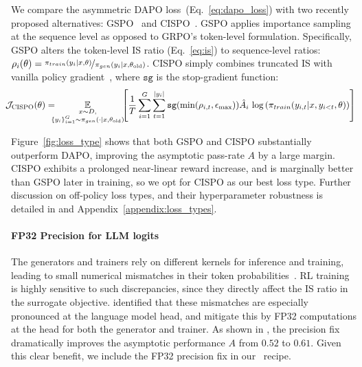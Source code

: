 We compare the asymmetric DAPO loss~(Eq.~\ref{eq:dapo_loss}) with two recently proposed alternatives: GSPO~\citep{gspo} and CISPO~\citep{minimax_m1, feng2025yourefficient}. GSPO applies importance sampling at the sequence level as opposed to GRPO’s token-level formulation. Specifically, GSPO alters the token-level IS ratio (Eq.~\ref{eq:is}) to sequence-level ratios: $ \rho_i(\theta) = \nicefrac{\pi_{train}(y_i|x, \theta)}{\pi_{gen}(y_i|x, \theta_{\text{old}})}$. CISPO simply combines truncated IS with vanilla policy gradient~\citep{ionides2008truncated}, where $\texttt{sg}$ is the stop-gradient function:
\begin{equation}
\hspace{-0.7em} \mathcal{J}_{\mathrm{CISPO}}(\theta) 
=\hspace{-0.7em} \underset{\substack{x \sim D, \\ \{y_i\}_{i=1}^G \sim \pi_{gen}(\cdot \mid x, \theta_{\text{old}})}}{\mathbb{E}}
\hspace{-0.4em}
\left[ \frac{1}{T} \sum_{i=1}^G \sum_{t=1}^{|y_i|} 
\texttt{sg}(\mathrm{min}(\rho_{i, t}, \epsilon_\text{max})) 
\hat{A}_i \, \log\left(\pi_{train}(y_{i,t}|x, y_{i<t},\theta)\right) \right]
\label{eq:cispo}
\end{equation} 


Figure~\ref{fig:loss_type} shows that both GSPO and CISPO substantially outperform DAPO, improving the asymptotic pass-rate $A$ by a large margin. CISPO exhibits a prolonged near-linear reward increase, and is marginally better than GSPO later in training, so we opt for CISPO as our best loss type. Further discussion on off-policy loss types, and their hyperparameter robustness is detailed in  and Appendix~\ref{appendix:loss_types}.



\paragraph{FP32 Precision for LLM logits}
\label{sec:fp32}

The generators and trainers rely on different kernels for inference and training, leading to small numerical mismatches in their token probabilities~\citep{he2025nondeterminism}. 
RL training is highly sensitive to such discrepancies, since they directly affect the IS ratio in the surrogate objective.
\citet{minimax_m1} identified that these mismatches are especially pronounced at the language model head, and mitigate this by FP32 computations at the head for both the generator and trainer. 
As shown in , the precision fix dramatically improves the asymptotic performance $A$ from $0.52$ to $0.61$. Given this clear benefit, we include the FP32 precision fix in our \scalerl\ recipe. 



